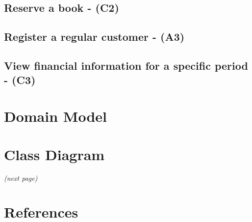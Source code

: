 \documentclass{article}
\begin{document}
% 

\newpage
\subsection{Reserve a book - (C2)}



\newpage
\subsection{Register a regular customer - (A3)}


\newpage
\subsection{View financial information for a specific period - (C3)}


\newpage
\section{Domain Model}


\newpage
\section{Class Diagram}
\textit{(next page)}


\newpage
\section{References}

\end{document}
